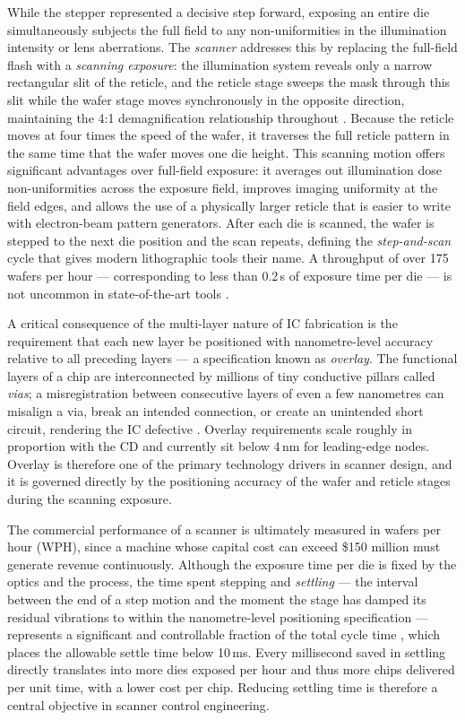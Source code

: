 While the stepper represented a decisive step forward, exposing an entire die simultaneously subjects the full field to any non-uniformities in the illumination intensity or lens aberrations. The \textit{scanner} addresses this by replacing the full-field flash with a \textit{scanning exposure}: the illumination system reveals only a narrow rectangular slit of the reticle, and the reticle stage sweeps the mask through this slit while the wafer stage moves synchronously in the opposite direction, maintaining the 4:1 demagnification relationship throughout \cite{Butler2011_PositionControl, Schmidt2012_UltraPrecision}. Because the reticle moves at four times the speed of the wafer, it traverses the full reticle pattern in the same time that the wafer moves one die height. This scanning motion offers significant advantages over full-field exposure: it averages out illumination dose non-uniformities across the exposure field, improves imaging uniformity at the field edges, and allows the use of a physically larger reticle that is easier to write with electron-beam pattern generators. After each die is scanned, the wafer is stepped to the next die position and the scan repeats, defining the \textit{step-and-scan} cycle that gives modern lithographic tools their name. A throughput of over 175 wafers per hour — corresponding to less than 0.2\,s of exposure time per die — is not uncommon in state-of-the-art tools \cite{Butler2011_PositionControl}.

A critical consequence of the multi-layer nature of IC fabrication is the requirement that each new layer be positioned with nanometre-level accuracy relative to all preceding layers — a specification known as \textit{overlay}. The functional layers of a chip are interconnected by millions of tiny conductive pillars called \textit{vias}; a misregistration between consecutive layers of even a few nanometres can misalign a via, break an intended connection, or create an unintended short circuit, rendering the IC defective \cite{Schmidt2012_UltraPrecision}. Overlay requirements scale roughly in proportion with the CD and currently sit below 4\,nm for leading-edge nodes. Overlay is therefore one of the primary technology drivers in scanner design, and it is governed directly by the positioning accuracy of the wafer and reticle stages during the scanning exposure.

The commercial performance of a scanner is ultimately measured in wafers per hour (WPH), since a machine whose capital cost can exceed \$150 million must generate revenue continuously. Although the exposure time per die is fixed by the optics and the process, the time spent stepping and \textit{settling} — the interval between the end of a step motion and the moment the stage has damped its residual vibrations to within the nanometre-level positioning specification — represents a significant and controllable fraction of the total cycle time \cite{Butler2011_PositionControl}, which places the allowable settle time below 10\,ms. Every millisecond saved in settling directly translates into more dies exposed per hour and thus more chips delivered per unit time, with a lower cost per chip. Reducing settling time is therefore a central objective in scanner control engineering.

